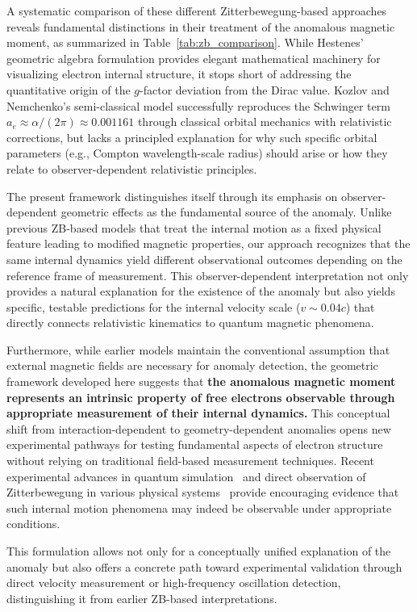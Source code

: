 \documentclass[%
 reprint,
 amsmath,amssymb,
 aps,
]{revtex4-1}
\numberwithin{equation}{section}%
\begin{document}
A systematic comparison of these different Zitterbewegung-based approaches reveals fundamental distinctions in their treatment of the anomalous magnetic moment, as summarized in Table~\ref{tab:zb_comparison}. While Hestenes' geometric algebra formulation provides elegant mathematical machinery for visualizing electron internal structure, it stops short of addressing the quantitative origin of the $g$-factor deviation from the Dirac value. Kozlov and Nemchenko's semi-classical model successfully reproduces the Schwinger term $a_e \approx \alpha/(2\pi) \approx 0.001161$ through classical orbital mechanics with relativistic corrections, but lacks a principled explanation for why such specific orbital parameters (e.g., Compton wavelength-scale radius) should arise or how they relate to observer-dependent relativistic principles.

The present framework distinguishes itself through its emphasis on observer-dependent geometric effects as the fundamental source of the anomaly. Unlike previous ZB-based models that treat the internal motion as a fixed physical feature leading to modified magnetic properties, our approach recognizes that the same internal dynamics yield different observational outcomes depending on the reference frame of measurement. This observer-dependent interpretation not only provides a natural explanation for the existence of the anomaly but also yields specific, testable predictions for the internal velocity scale ($v \sim 0.04c$) that directly connects relativistic kinematics to quantum magnetic phenomena.

Furthermore, while earlier models maintain the conventional assumption that external magnetic fields are necessary for anomaly detection, the geometric framework developed here suggests that \textbf{the anomalous magnetic moment represents an intrinsic property of free electrons observable through appropriate measurement of their internal dynamics.} This conceptual shift from interaction-dependent to geometry-dependent anomalies opens new experimental pathways for testing fundamental aspects of electron structure without relying on traditional field-based measurement techniques. Recent experimental advances in quantum simulation~\cite{gerritsma2010} and direct observation of Zitterbewegung in various physical systems~\cite{leblanc2013, schliemann2005, zawadzki2011, zhang2023} provide encouraging evidence that such internal motion phenomena may indeed be observable under appropriate conditions.

This formulation allows not only for a conceptually unified explanation of the anomaly but also offers a concrete path toward experimental validation through direct velocity measurement or high-frequency oscillation detection, distinguishing it from earlier ZB-based interpretations.
\end{document}
